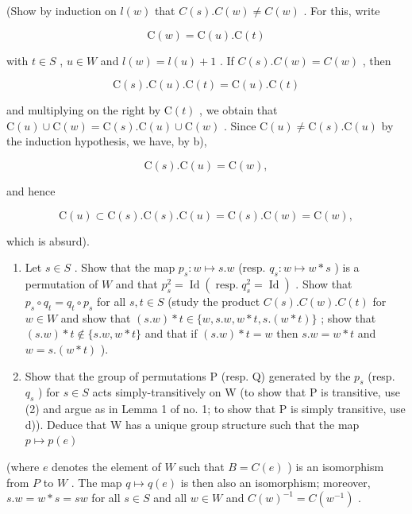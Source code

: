(Show by induction on \(l(w)\) that \(C(s).C(w) \neq C(w)\) . For this, write

\[
\mathrm{C} (w) = \mathrm{C} (u). \mathrm{C} (t)
\]

with \(t \in S\) , \(u \in W\) and \(l(w) = l(u) + 1\) . If \(C(s).C(w) = C(w)\) , then

\[
\mathrm{C} (s). \mathrm{C} (u). \mathrm{C} (t) = \mathrm{C} (u). \mathrm{C} (t)
\]

and multiplying on the right by \(\mathrm{C}(t)\) , we obtain that \(\mathrm{C}(u) \cup \mathrm{C}(w) = \mathrm{C}(s).\mathrm{C}(u) \cup \mathrm{C}(w)\) . Since \(\mathrm{C}(u) \neq \mathrm{C}(s).\mathrm{C}(u)\) by the induction hypothesis, we have, by b),

\[
\mathrm{C} (s). \mathrm{C} (u) = \mathrm{C} (w),
\]

and hence

\[
\mathrm{C} (u) \subset \mathrm{C} (s). \mathrm{C} (s). \mathrm{C} (u) = \mathrm{C} (s). \mathrm{C} (w) = \mathrm{C} (w),
\]

which is absurd).

\begin{enumerate}
\def\labelenumi{\alph{enumi})}
\setcounter{enumi}{3}
\item
  Let \(s \in S\) . Show that the map \(p_s: w \mapsto s.w\) (resp. \(q_s: w \mapsto w * s\) ) is a permutation of \(W\) and that \(p_s^2 = \operatorname{Id}(\operatorname{resp.} q_s^2 = \operatorname{Id})\) . Show that \(p_s \circ q_t = q_t \circ p_s\) for all \(s, t \in S\) (study the product \(C(s).C(w).C(t)\) for \(w \in W\) and show that \((s.w) * t \in \{w, s.w, w * t, s.(w * t)\}\) ; show that \((s.w) * t \notin \{s.w, w * t\}\) and that if \((s.w) * t = w\) then \(s.w = w * t\) and \(w = s.(w * t)\) ).
\item
  Show that the group of permutations P (resp. Q) generated by the \(p_{s}\) (resp. \(q_{s}\) ) for \(s \in S\) acts simply-transitively on W (to show that P is transitive, use (2) and argue as in Lemma 1 of no. 1; to show that P is simply transitive, use d)). Deduce that W has a unique group structure such that the map \(p \mapsto p(e)\)
\end{enumerate}

(where \(e\) denotes the element of \(W\) such that \(B = C(e)\) ) is an isomorphism from \(P\) to \(W\) . The map \(q \mapsto q(e)\) is then also an isomorphism; moreover, \(s.w = w * s = sw\) for all \(s \in S\) and all \(w \in W\) and \(C(w)^{-1} = C(w^{-1})\) .


